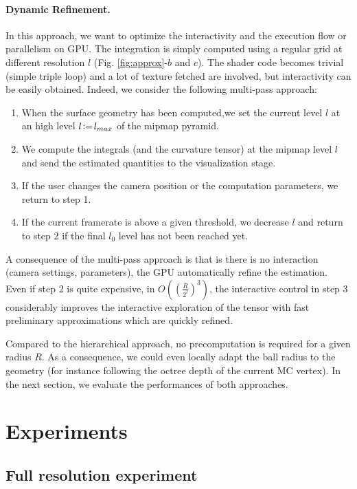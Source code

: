 \documentclass{llncs}
\begin{document}
\paragraph{Dynamic Refinement.} In this approach, we want to optimize
the interactivity and the execution flow or parallelism on GPU. The
integration is simply computed using a regular grid at different
resolution $l$ (Fig. \ref{fig:approx}-$b$ and $c$). The shader code
becomes trivial (simple triple loop) and a lot of texture fetched are
involved, but interactivity can be easily obtained. Indeed, we
consider the following multi-pass approach:
\begin{enumerate}
\item When the surface geometry has been computed,we set the current
  level $l$ at an high level $l\!\mathrel{\mathop:}=\! l_{max}$ of the mipmap
  pyramid.
\item We compute the integrals (and the curvature tensor) at the
  mipmap level $l$ and  send the estimated quantities to the
  visualization stage.
\item If the user changes the camera position or the computation
  parameters, we return to step 1.
\item If the current framerate is above a given threshold, we decrease
  $l$ and return to step 2 if the final $l_0$ level has not been
  reached yet.
\end{enumerate}
A consequence of the multi-pass approach is that is there is no
interaction (camera settings, parameters), the GPU automatically
refine the estimation. Even if step 2 is quite expensive, in
$O\left(\left(\frac{R}{2^l}\right)^3\right)$, the interactive control
 in step 3 considerably improves the interactive exploration of the
 tensor with fast preliminary approximations which are quickly refined.

 Compared to the hierarchical approach, no precomputation is required
 for a given radius $R$. As a consequence, we could even locally adapt
 the ball radius to the geometry (for instance following the octree
 depth of the current MC vertex). In the next section, we evaluate the
 performances of both approaches.


\section{Experiments}
\label{sec:experiments}

\subsection{Full resolution experiment}
\end{document}
